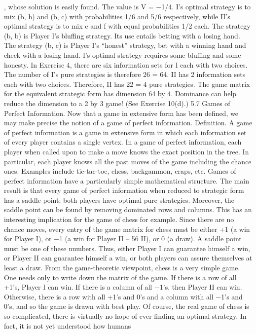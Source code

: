 , whose solution is
easily found. The value is V = −1/4. I’s optimal strategy is to mix (b, b) and (b, c) with
probabilities 1/6 and 5/6 respectively, while II’s optimal strategy is to mix c and f with
equal probabilities 1/2 each. The strategy (b, b) is Player I’s bluffing strategy. Its use
entails betting with a losing hand. The strategy (b, c) is Player I’s “honest” strategy, bet
with a winning hand and check with a losing hand. I’s optimal strategy requires some
bluffing and some honesty.
In Exercise 4, there are six information sets for I each with two choices. The number
of I’s pure strategies is therefore 26 = 64. II has 2 information sets each with two choices.
Therefore, II has 22 = 4 pure strategies. The game matrix for the equivalent strategic
form has dimension 64 by 4. Dominance can help reduce the dimension to a 2 by 3 game!
(See Exercise 10(d).)
5.7 Games of Perfect Information. Now that a game in extensive form has been
defined, we may make precise the notion of a game of perfect information.
Definition. A game of perfect information is a game in extensive form in which each
information set of every player contains a single vertex.
In a game of perfect information, each player when called upon to make a move knows
the exact position in the tree. In particular, each player knows all the past moves of the
game including the chance ones. Examples include tic-tac-toe, chess, backgammon, craps,
etc.
Games of perfect information have a particularly simple mathematical structure. The
main result is that every game of perfect information when reduced to strategic form has
a saddle point; both players have optimal pure strategies. Moreover, the saddle point can
be found by removing dominated rows and columns. This has an interesting implication
for the game of chess for example. Since there are no chance moves, every entry of the
game matrix for chess must be either +1 (a win for Player I), or −1 (a win for Player
II – 56
II), or 0 (a draw). A saddle point must be one of these numbers. Thus, either Player
I can guarantee himself a win, or Player II can guarantee himself a win, or both players
can assure themselves at least a draw. From the game-theoretic viewpoint, chess is a very
simple game. One needs only to write down the matrix of the game. If there is a row of all
+1’s, Player I can win. If there is a column of all −1’s, then Player II can win. Otherwise,
there is a row with all +1’s and 0’s and a column with all −1’s and 0’s, and so the game is
drawn with best play. Of course, the real game of chess is so complicated, there is virtually
no hope of ever finding an optimal strategy. In fact, it is not yet understood how humans
